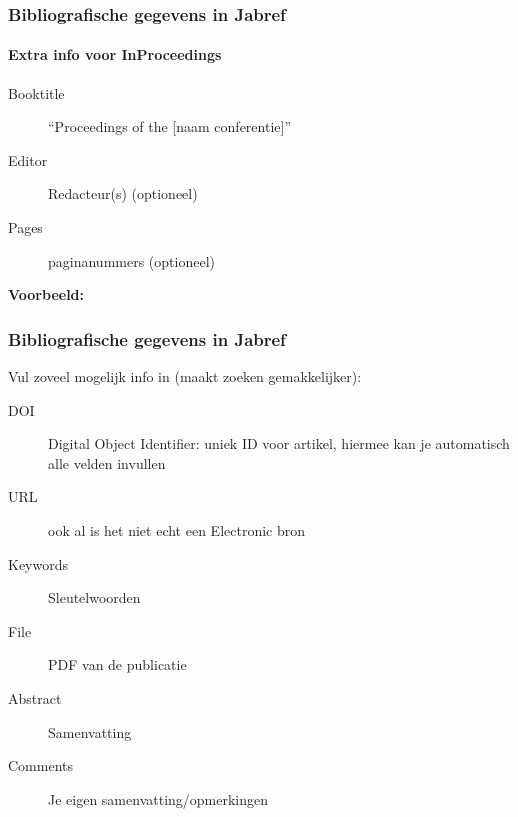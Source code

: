 \documentclass[aspectratio=169]{beamer}
\begin{document}
\begin{frame}
  \frametitle{Bibliografische gegevens in Jabref}
  \framesubtitle{Extra info voor InProceedings}
  
  \begin{description}
    \item[Booktitle] ``Proceedings of the [naam conferentie]''
    \item[Editor] Redacteur(s) (optioneel)
    \item[Pages] paginanummers (optioneel)
  \end{description}
  
  \medskip
  
  \textbf{Voorbeeld:}
  
\end{frame}

\begin{frame}
  \frametitle{Bibliografische gegevens in Jabref}
  
  Vul zoveel mogelijk info in (maakt zoeken gemakkelijker):
  
  \begin{description}
    \item[DOI] Digital Object Identifier: uniek ID voor artikel, hiermee kan je automatisch alle velden invullen
    \item[URL] ook al is het niet echt een Electronic bron
    \item[Keywords] Sleutelwoorden
    \item[File] PDF van de publicatie
    \item[Abstract] Samenvatting
    \item[Comments] Je eigen samenvatting/opmerkingen
  \end{description}
  
\end{frame}
\end{document}

